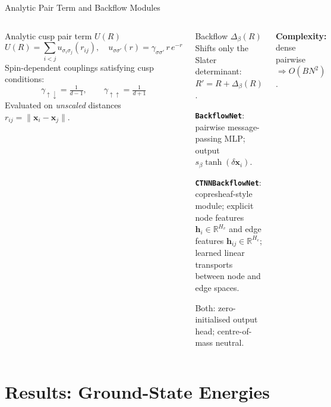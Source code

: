 \documentclass[aspectratio=169,10pt]{beamer}
\begin{document}
\begin{frame}{Analytic Pair Term and Backflow Modules}
  \begin{columns}[T]
      \begin{block}{Analytic cusp pair term $U(R)$}
        \[
          U(R)=\sum_{i<j} u_{\sigma_i\sigma_j}(r_{ij}),\quad
          u_{\sigma\sigma'}(r)=\gamma_{\sigma\sigma'}\,r\,e^{-r}
        \]
        Spin-dependent couplings satisfying cusp conditions:
        \[
          \gamma_{\uparrow\downarrow}=\tfrac{1}{d-1},\qquad
          \gamma_{\uparrow\uparrow}=\tfrac{1}{d+1}
        \]
        Evaluated on \emph{unscaled} distances $r_{ij}=\|\mathbf x_i-\mathbf x_j\|$.
      \end{block}
      \begin{block}{Backflow $\Delta_\beta(R)$}
        Shifts only the Slater determinant: $R'=R+\Delta_\beta(R)$.

        \smallskip
        \textbf{\texttt{BackflowNet}}: pairwise message-passing MLP;
        output $s_\beta\tanh(\delta\mathbf x_i)$.

        \smallskip
        \textbf{\texttt{CTNNBackflowNet}}: copresheaf-style module;
        explicit node features $\mathbf h_i\in\mathbb R^{H_v}$ and
        edge features $\mathbf h_{ij}\in\mathbb R^{H_e}$; learned
        linear transports between node and edge spaces.

        \smallskip
        Both: zero-initialised output head; centre-of-mass neutral.
      \end{block}
      \vspace{0.2cm}
      \textbf{Complexity:} dense pairwise $\Rightarrow O(BN^2)$.
  \end{columns}
\end{frame}

\section{Results: Ground-State Energies}
\end{document}
